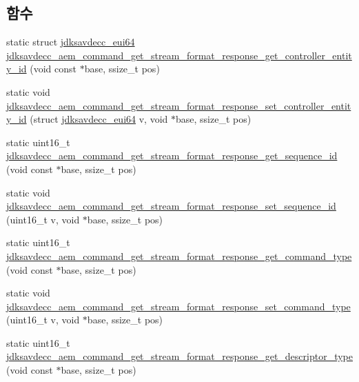\subsection*{함수}
\begin{DoxyCompactItemize}
\item 
static struct \hyperlink{structjdksavdecc__eui64}{jdksavdecc\+\_\+eui64} \hyperlink{group__command__get__stream__format__response_ga4294d0d91017835aedd161e9d940162e}{jdksavdecc\+\_\+aem\+\_\+command\+\_\+get\+\_\+stream\+\_\+format\+\_\+response\+\_\+get\+\_\+controller\+\_\+entity\+\_\+id} (void const $\ast$base, ssize\+\_\+t pos)
\item 
static void \hyperlink{group__command__get__stream__format__response_gaa955487889d2d68ecd93d6b7e44e18bf}{jdksavdecc\+\_\+aem\+\_\+command\+\_\+get\+\_\+stream\+\_\+format\+\_\+response\+\_\+set\+\_\+controller\+\_\+entity\+\_\+id} (struct \hyperlink{structjdksavdecc__eui64}{jdksavdecc\+\_\+eui64} v, void $\ast$base, ssize\+\_\+t pos)
\item 
static uint16\+\_\+t \hyperlink{group__command__get__stream__format__response_ga0df5ae1c2bc3669ced677690821484d6}{jdksavdecc\+\_\+aem\+\_\+command\+\_\+get\+\_\+stream\+\_\+format\+\_\+response\+\_\+get\+\_\+sequence\+\_\+id} (void const $\ast$base, ssize\+\_\+t pos)
\item 
static void \hyperlink{group__command__get__stream__format__response_ga9b5eab6bd43e6d4f4c10a846bc3f4dad}{jdksavdecc\+\_\+aem\+\_\+command\+\_\+get\+\_\+stream\+\_\+format\+\_\+response\+\_\+set\+\_\+sequence\+\_\+id} (uint16\+\_\+t v, void $\ast$base, ssize\+\_\+t pos)
\item 
static uint16\+\_\+t \hyperlink{group__command__get__stream__format__response_gae6ff35a2ef8bb5be6fd4f0e24c9356ce}{jdksavdecc\+\_\+aem\+\_\+command\+\_\+get\+\_\+stream\+\_\+format\+\_\+response\+\_\+get\+\_\+command\+\_\+type} (void const $\ast$base, ssize\+\_\+t pos)
\item 
static void \hyperlink{group__command__get__stream__format__response_gacfa01d91d37b9f3dafd240f691c90c3a}{jdksavdecc\+\_\+aem\+\_\+command\+\_\+get\+\_\+stream\+\_\+format\+\_\+response\+\_\+set\+\_\+command\+\_\+type} (uint16\+\_\+t v, void $\ast$base, ssize\+\_\+t pos)
\item 
static uint16\+\_\+t \hyperlink{group__command__get__stream__format__response_ga241be5e90082adf05f17e1139bc77bc4}{jdksavdecc\+\_\+aem\+\_\+command\+\_\+get\+\_\+stream\+\_\+format\+\_\+response\+\_\+get\+\_\+descriptor\+\_\+type} (void const $\ast$base, ssize\+\_\+t pos)
\item 

\end{DoxyCompactItemize}
